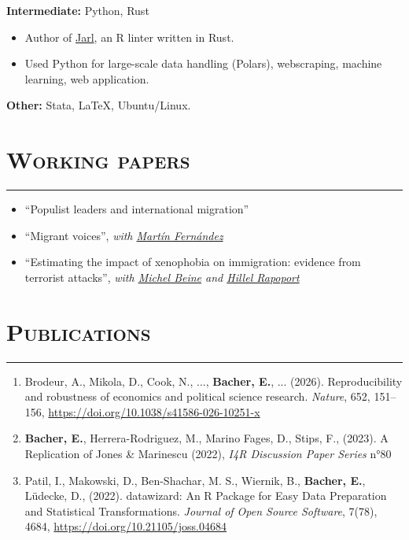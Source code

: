 \documentclass{article}
\newcommand{\sectionline}{%
  \vspace{-0.6cm}%
  \par\noindent\rule{\textwidth}{0.4pt}%
}
\let\xsection=\section
\renewcommand{\section}[1]{%
  \vspace{0.1cm}%
  \xsection*{\scshape{#1}}%
  \sectionline%
}
\def\tightlist{}
\begin{document}
\vspace{0.3cm}

\textbf{Intermediate:} Python, Rust

\begin{itemize}
\item Author of \href{https://jarl.etiennebacher.com/}{Jarl}, an R linter written in Rust.
\item Used Python for large-scale data handling (Polars), webscraping, machine learning, web application.
\end{itemize}

\vspace{0.3cm}

\textbf{Other:} Stata, LaTeX, Ubuntu/Linux.

\vspace{-0.2cm}

\section{Working papers}

\begin{itemize}
\tightlist
\item
  ``Populist leaders and international migration''
\item
  ``Migrant voices'', \emph{with
  \href{https://sites.google.com/view/martinfernandezsanchez/}{Martín
  Fernández}}
\item
  ``Estimating the impact of xenophobia on immigration: evidence from terrorist attacks'', \emph{with
  \href{https://sites.google.com/site/michelbeineeconomics/home}{Michel
  Beine} and
  \href{https://www.parisschoolofeconomics.eu/en/rapoport-hillel/}{Hillel
  Rapoport}}
\end{itemize}

\section{Publications}

\begin{enumerate}
\def\labelenumi{\arabic{enumi}.}
\item
Brodeur, A., Mikola, D., Cook, N., ..., \textbf{Bacher, E.}, ... (2026). Reproducibility and robustness of economics and political science research. \emph{Nature}, 652, 151–156,
\url{https://doi.org/10.1038/s41586-026-10251-x}
\item
  \textbf{Bacher, E.}, Herrera-Rodriguez, M., Marino Fages, D., Stips,
  F., (2023). A Replication of Jones \& Marinescu (2022), \emph{I4R
  Discussion Paper Series} n°80
\item
  Patil, I., Makowski, D., Ben-Shachar, M. S., Wiernik, B.,
  \textbf{Bacher, E.}, Lüdecke, D., (2022). datawizard: An R Package for
  Easy Data Preparation and Statistical Transformations. \emph{Journal
  of Open Source Software}, 7(78), 4684,
  \url{https://doi.org/10.21105/joss.04684}
\end{enumerate}
\end{document}
